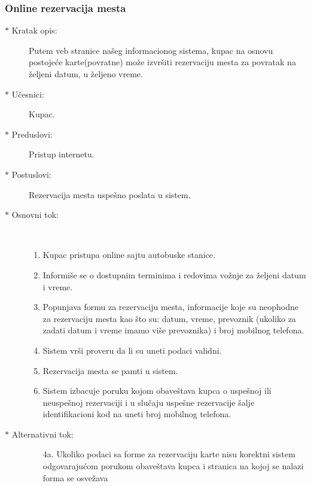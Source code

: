 \subsubsection{Online rezervacija mesta}
\begin{description}
	\item [$\ast$ Kratak opis: ] Putem veb stranice na\v seg informacionog sistema, kupac na osnovu postoje\' ce karte(povratne) mo\v ze izvr\v siti rezervaciju mesta za povratak na \v zeljeni datum, u \v zeljeno vreme.
	\item[$\ast$ U\v cesnici: ] Kupac.
	\item[$\ast$ Preduslovi: ] Pristup internetu.
	\item[$\ast$ Postuslovi: ] Rezervacija mesta uspe\v sno poslata u sistem.
	\item[$\ast$ Osnovni tok: ] \ \\
	\renewcommand{\labelenumii}{\Roman{enumii}}
	\begin{enumerate}
		\item Kupac pristupa online sajtu autobuske stanice.
		\item Informi\v se se o dostupnim terminima i redovima vo\v znje za \v zeljeni datum i vreme.
		\item Popunjava formu za rezervaciju mesta, informacije koje su neophodne za rezervaciju mesta kao \v sto su: datum, vreme, prevoznik (ukoliko za zadati datum i vreme imamo vi\v se prevoznika) i broj mobilnog telefona.
		\item Sistem vr\v si proveru da li su uneti podaci validni.
		\item Rezervacija mesta se pamti u sistem.
		\item Sistem izbacuje poruku kojom obave\v stava kupca o uspe\v snoj ili neuspe\v snoj rezervaciji i u slu\v caju uspe\v sne rezervacije \v salje identifikacioni kod na uneti broj mobilnog telefona.
	\end{enumerate}
	\item[$\ast$ Alternativni tok: ]
	\begin{enumerate}
	\item[4a. ] Ukoliko podaci sa forme za rezervaciju karte nisu korektni sistem odgovaraju\' com porukom obave\v stava kupca i stranica na kojoj se nalazi forma se osve\v zava
	\end{enumerate}
\end{description}
\newpage
